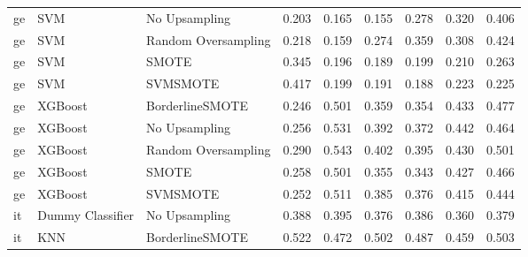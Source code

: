 \begin{tabular}{lllllllll}
      ge &                          SVM &       No Upsampling & 0.203 &                     0.165 &                 0.155 &                  0.278 &                                   0.320 &     0.406 \\
      ge &                          SVM & Random Oversampling & 0.218 &                     0.159 &                 0.274 &                  0.359 &                                   0.308 &     0.424 \\
      ge &                          SVM &               SMOTE & 0.345 &                     0.196 &                 0.189 &                  0.199 &                                   0.210 &     0.263 \\
      ge &                          SVM &            SVMSMOTE & 0.417 &                     0.199 &                 0.191 &                  0.188 &                                   0.223 &     0.225 \\
      ge &                      XGBoost &     BorderlineSMOTE & 0.246 &                     0.501 &                 0.359 &                  0.354 &                                   0.433 &     0.477 \\
      ge &                      XGBoost &       No Upsampling & 0.256 &                     0.531 &                 0.392 &                  0.372 &                                   0.442 &     0.464 \\
      ge &                      XGBoost & Random Oversampling & 0.290 &                     0.543 &                 0.402 &                  0.395 &                                   0.430 &     0.501 \\
      ge &                      XGBoost &               SMOTE & 0.258 &                     0.501 &                 0.355 &                  0.343 &                                   0.427 &     0.466 \\
      ge &                      XGBoost &            SVMSMOTE & 0.252 &                     0.511 &                 0.385 &                  0.376 &                                   0.415 &     0.444 \\
      it &             Dummy Classifier &       No Upsampling & 0.388 &                     0.395 &                 0.376 &                  0.386 &                                   0.360 &     0.379 \\
      it &                          KNN &     BorderlineSMOTE & 0.522 &                     0.472 &                 0.502 &                  0.487 &                                   0.459 &     0.503 \\

\end{tabular}
